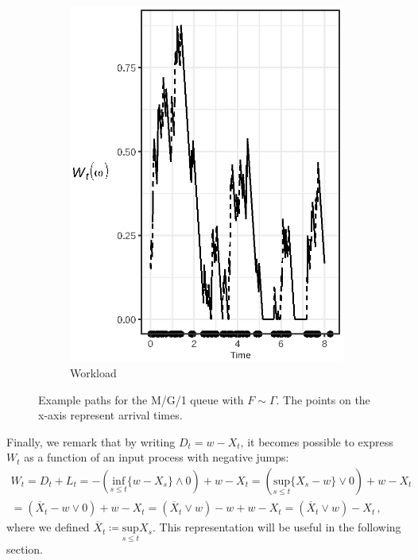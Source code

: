 \documentclass[titlepage]{article}
\theoremstyle{plain}
\theoremstyle{definition}
\begin{document}
{\begin{landscape}
\begin{figure}
\begin{subfigure}{0.45\linewidth}
        \includegraphics{workload}
        \caption{Workload}
      \end{subfigure}
      \caption{Example paths for the M/G/1 queue with $F \sim \Gamma$. The points on the x-axis represent arrival times.}
      \label{fig:example-paths}
    \end{figure}
  \end{landscape}
}

Finally, we remark that by writing $D_t = w - X_t$, it becomes possible to express $W_t$ as a function of an input process with negative jumps:
\begin{multline}
  W_t = D_t + L_t = -(\underset{s \leq t}{\mathrm{inf}} \{ w - X_s \} \wedge 0) + w - X_t = (\underset{s \leq t}{\mathrm{sup}} \{ X_s - w \} \vee 0) + w - X_t \\
  = (\overline{X}_t - w \vee 0) + w - X_t = (\overline{X}_t \vee w) - w + w - X_t = (\overline{X}_t \vee w) - X_t \,,
\end{multline}
where we defined $\overline{X}_t \coloneqq \underset{s \leq t}{\mathrm{sup}} X_s$. This representation will be useful in the following section.
\end{document}
